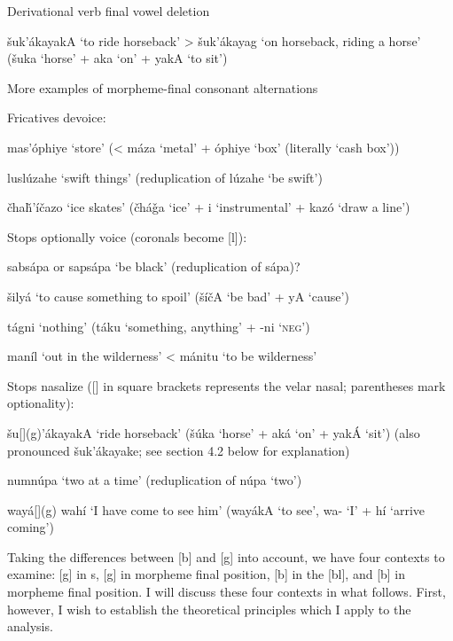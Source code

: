 \documentclass[output=paper]{LSP/langsci}
\begin{document}
\begin{exe}
\ex \label{ex:rood:7}
Derivational verb final vowel deletion

\v{s}uk'ákayakA `to ride horseback' > \v{s}uk'ákayag `on horseback, riding a horse' (\v{s}uka `horse' + aka `on' + yakA `to sit')
\end{exe}

\begin{exe}
\ex \label{ex:rood:8}
More examples of morpheme-final consonant alternations
\begin{xlist}
\ex Fricatives devoice:

mas'\'ophiye `store' (< máza `metal' + \'ophiye `box' (literally `cash box'))

luslúzahe `swift things' (reduplication of lúzahe `be swift')

\v{c}ha\v{h}'í\v{c}azo `ice skates' (\v{c}há\v{g}a `ice' + i `instrumental' + kaz\'o `draw a line')

\ex Stops optionally voice (coronals become [l]):

sabsápa or sapsápa `be black' (reduplication of sápa)?

\v{s}ilyá `to cause something to spoil' (\v{s}í\v{c}A `be bad' + yA `cause')

tágni `nothing' (táku `something, anything' + -ni `\textsc{neg}')

maníl `out in the wilderness' < mánitu `to be wilderness'

\ex Stops nasalize ([] in square brackets represents the velar nasal; parentheses mark optionality):

\v{s}u[](g)'ákayakA `ride horseback' (\v{s}úka `horse' + aká `on' + ya\-kÁ `sit') (also pronounced \v{s}uk'ákayake; see section 4.2 below for explanation)

numnúpa `two at a time' (reduplication of núpa `two')

wayá[](g) wahí `I have come to see him' (wayákA `to see', wa- `I' + hí `arrive coming')
\end{xlist}
\end{exe}

Taking the differences between [b] and [g] into account, we have four contexts to examine: [g] in s, [g] in morpheme final position, [b] in the  [bl], and [b] in morpheme final position. I will discuss these four contexts in what follows. First, however, I wish to establish the theoretical principles which I apply to the analysis.
\end{document}
